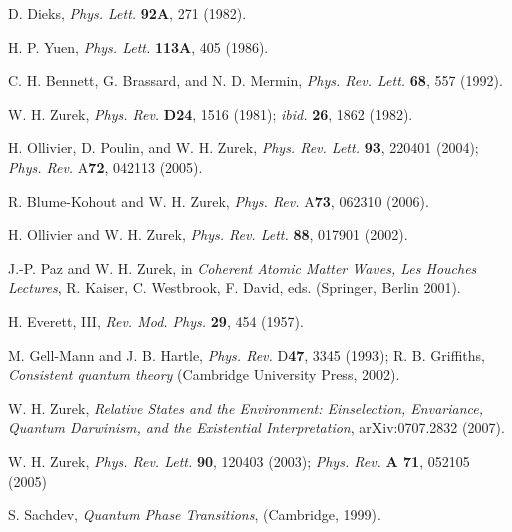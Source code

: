 \documentclass[aps,twocolumn,pra]{revtex4}
\newcommand{\+}         {\dagger}
\begin{document}
\noindent [12] D. Dieks, {\it Phys. Lett.} {\bf 92A}, 271 (1982).

\noindent [13] H. P. Yuen, {\it Phys. Lett.} {\bf 113A}, 405 (1986).

\noindent [14] C. H. Bennett, G. Brassard, and N. D. Mermin, {\it Phys. Rev. Lett.} {\bf 68}, 557 (1992).

\noindent [15] W. H. Zurek, {\it Phys. Rev.} {\bf D24}, 1516 (1981); {\em ibid.} {\bf 26}, 1862 (1982).

\noindent [16] H. Ollivier, D. Poulin, and W. H. Zurek, {\it Phys. Rev. Lett.} {\bf 93}, 220401 (2004); {\it Phys. Rev.} A{\bf 72}, 042113 (2005).

\noindent [17] R. Blume-Kohout and W. H. Zurek, {\it Phys. Rev.} A{\bf 73}, 062310 (2006).

\noindent [18] H. Ollivier and W. H. Zurek, {\it Phys. Rev. Lett.} {\bf 88}, 017901 (2002).

\noindent [19] J.-P. Paz and W. H. Zurek, in {\it Coherent Atomic Matter Waves, Les Houches Lectures}, R. Kaiser, C. Westbrook, F. David, eds. (Springer, Berlin 2001).

\noindent [20] H. Everett, III, {\it Rev. Mod. Phys.} {\bf 29}, 454 (1957).

\noindent [21] M. Gell-Mann and J. B. Hartle, {\it Phys. Rev.} D{\bf 47}, 3345 (1993); R. B. Griffiths,  
{\it Consistent quantum theory} (Cambridge University Press, 2002).

\noindent [22] W. H. Zurek, {\it Relative States and the Environment: Einselection, Envariance, Quantum Darwinism, and the Existential Interpretation}, arXiv:0707.2832 (2007).

\noindent [23] W. H. Zurek, {\it Phys. Rev. Lett.} {\bf 90}, 120403 (2003); {\it Phys. Rev.} {\bf A 71}, 052105 (2005)



\noindent [24] S. Sachdev, {\it Quantum Phase Transitions}, (Cambridge, 1999).
\end{document}
